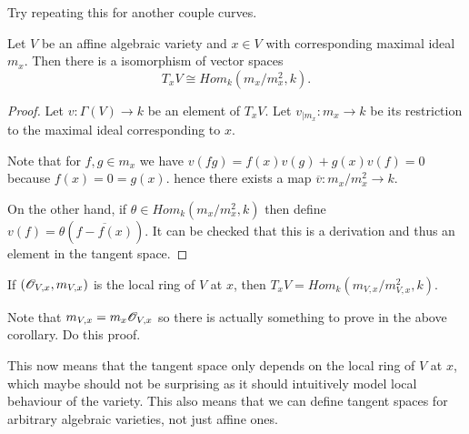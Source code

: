 \begin{problem}
Try repeating this for another couple curves.
\end{problem}

\begin{proposition}
Let $V$ be an affine algebraic variety and $x\in V$ with corresponding maximal ideal $m_x$. Then there is a isomorphism of vector spaces
\begin{equation*}
    T_x V \cong Hom_k (m_x / m_x^2, k).
\end{equation*}
\end{proposition}
\begin{proof}
Let $v\colon \Gamma(V)\longrightarrow k$ be an element of $T_x V$. Let $v_{|m_x}\colon m_x\longrightarrow k$ be its restriction to the maximal ideal corresponding to $x$. 

Note that for $f, g\in m_x$ we have $v(fg) = f(x)v(g) + g(x)v(f) = 0$ because $f(x) = 0 = g(x)$. hence there exists a map $\overline{v}\colon m_x/m_x^2\longrightarrow k$.

On the other hand, if $\theta \in Hom_k(m_x/m_x^2, k)$ then define $v(f) = \theta(\overline{f-f(x)})$. It can be checked that this is a derivation and thus an element in the tangent space. 
\end{proof}

\begin{corollary}
If $(\mathscr{O}_{V, x}, m_{V, x})$ is the local ring of $V$ at $x$, then $T_x V = Hom_k(m_{V, x}/m_{V, x}^2, k)$. 
\end{corollary}

\begin{problem}
Note that $m_{V, x} = m_x\mathscr{O}_{V, x}$ so there is actually something to prove in the above corollary. Do this proof. 
\end{problem}

This now means that the tangent space only depends on the local ring of $V$ at $x$, which maybe should not be surprising as it should intuitively model local behaviour of the variety. This also means that we can define tangent spaces for arbitrary algebraic varieties, not just affine ones. 